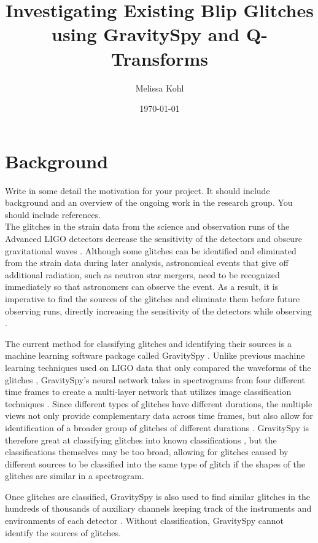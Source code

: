 \documentclass[a4paper]{article}
\title{Investigating Existing Blip Glitches using GravitySpy and Q-Transforms}
\author{Melissa Kohl}
\date{\today}
\begin{document}
\maketitle
\graphicspath{ {images/} }

\section{Background} Write in some detail the motivation for your project. It should include background and an overview of the ongoing work in the research group. You should include references. ~\\

The glitches in the strain data from the science and observation runs of the Advanced LIGO detectors decrease the sensitivity of the detectors and obscure gravitational waves \cite{Zevin:2016}. Although some glitches can be identified and eliminated from the strain data during later analysis, astronomical events that give off additional radiation, such as neutron star mergers, need to be recognized immediately so that astronomers can observe the event. As a result, it is imperative to find the sources of the glitches and eliminate them before future observing runs, directly increasing the sensitivity of the detectors while observing \cite{Mukherjee:2010}. 

The current method for classifying glitches and identifying their sources is a machine learning software package called GravitySpy \cite{Zevin:2016}. Unlike previous machine learning techniques used on LIGO data that only compared the waveforms of the glitches \cite{Mukherjee:2010}, GravitySpy's neural network takes in spectrograms from four different time frames to create a multi-layer network that utilizes image classification techniques \cite{Bahaadini:2017}. Since different types of glitches have different durations, the multiple views not only provide complementary data across time frames, but also allow for identification of a broader group of glitches of different durations \cite{Bahaadini:2017}. GravitySpy is therefore great at classifying glitches into known classifications \cite{Zevin:2016}, but the classifications themselves may be too broad, allowing for glitches caused by different sources to be classified into the same type of glitch if the shapes of the glitches are similar in a spectrogram.

Once glitches are classified, GravitySpy is also used to find similar glitches in the hundreds of thousands of auxiliary channels keeping track of the instruments and environments of each detector \cite{Zevin:2016}. Without classification, GravitySpy cannot identify the sources of glitches.
\end{document}
